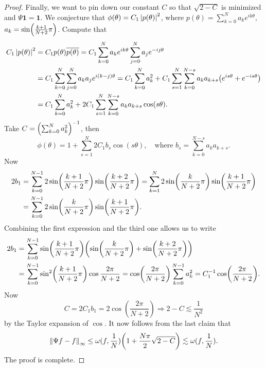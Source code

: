 \begin{proof}
    Finally, we want to pin down our constant $C$ so that $\sqrt{2 - C}$ is minimized 
    and $\Psi \mathbf{1} = \mathbf{1}$. We conjecture that $\phi(\theta) = C_1\left\lvert {p(\theta)} \right\rvert^2$, 
    where $p(\theta) = \sum_{k=0}^{N} a_ke^{ik\theta}$, $a_k = \sin\pth{\frac{k+1}{N+2}\pi}$. 
    Compute that 
    \begin{equation*}
        \begin{split}
            C_1\abs{p(\theta)}^2 &= C_1p(\theta)\overline{p(\theta)} = C_1\sum_{k=0}^{N}a_ke^{ik\theta}\sum_{j=0}^{N}a_je^{-ij\theta}  \\
            &= C_1\sum_{k=0}^{N}\sum_{j=0}^{N}a_ka_j e^{i(k-j)\theta} = C_1\sum_{k=0}^{N}a_k^2 + C_1\sum_{s=1}^{N}\sum_{k=0}^{N-s}a_ka_{k+s}\pth{e^{is\theta} + e^{-is\theta}} \\ 
            &= C_1\sum_{k=0}^{N}a_k^2 + 2C_1\sum_{s=1}^{N}\sum_{k=0}^{N-s}a_ka_{k+s}\cos(s\theta).
        \end{split}
    \end{equation*}
    Take $C = \pth{\sum_{k=0}^N a_k^2}^{-1}$, then
    \begin{equation*}
        \phi(\theta) = 1 + \sum_{s=1}^{N}2C_1b_s\cos(s\theta), \quad \text{where } b_s = \sum_{k=0}^{N-s}a_ka_{k+s}.
    \end{equation*}
    Now 
    \begin{equation*}
        \begin{split}
            2b_1 &= \sum_{k=0}^{N-1}2\sin\pth{\frac{k+1}{N+2}\pi}\sin\pth{\frac{k+2}{N+2}\pi} 
            = \sum_{k=1}^{N}2\sin\pth{\frac{k}{N+2}\pi}\sin\pth{\frac{k+1}{N+2}\pi} \\
            &= \sum_{k=0}^{N-1}2\sin\pth{\frac{k}{N+2}\pi}\sin\pth{\frac{k+1}{N+2}\pi}.
        \end{split}
    \end{equation*}
    Combining the first expression and the third one allows us to write 
    \begin{equation*}
        \begin{split}
            2b_1 &= \sum_{k=0}^{N-1}\sin\pth{\frac{k+1}{N+2}\pi}\pth{\sin\pth{\frac{k}{N+2}\pi} + \sin\pth{\frac{k+2}{N+2}\pi}} \\
            &= \sum_{k=0}^{N-1}\sin^2\pth{\frac{k+1}{N+2}\pi}\cos\frac{2\pi}{N+2} 
            = \cos\pth{\frac{2\pi}{N+2}}\sum_{k=0}^{N-1}a_k^2 = C_1^{-1}\cos\pth{\frac{2\pi}{N+2}}.
        \end{split}
    \end{equation*}
    Now 
    \begin{equation*}
        C = 2C_1b_1 = 2\cos(\frac{2\pi}{N+2}) \Rightarrow 2 - C \lesssim \frac{1}{N^2}
    \end{equation*}
    by the Taylor expansion of $\cos$. It now follows from the last claim that 
    \begin{equation*}
        \norm{\Psi f - f}_\infty \leq \omega(f,\frac{1}{N})\pth{1 + \frac{N\pi}{2}\sqrt{2 - C}} \lesssim \omega(f,\frac{1}{N}).
    \end{equation*}
    The proof is complete.
\end{proof}